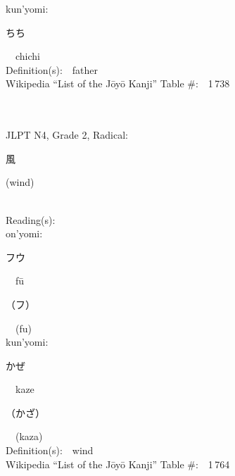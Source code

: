 \begin{multicols}{2}
{\hspace*{1em}}kun'yomi:\ \ \\
{\hspace*{2em}}{\begin{CJK}{UTF8}{min} ちち \end{CJK}}\ \ chichi\ \ \\
Definition(s):\ \ father \\
Wikipedia ``List of the J\=oy\=o Kanji'' Table \#:\ \ 1\,738 \\
\ \ \\
{\fontsize{34pt}{40pt}  }\ \ \\  %
{JLPT N4, Grade 2, Radical:\ \ {\begin{CJK}{UTF8}{min} 風 \end{CJK}} (wind) } \\
Reading(s):\ \ \\
{\hspace*{1em}}on'yomi:\ \ \\
{\hspace*{2em}}{\begin{CJK}{UTF8}{min} フウ \end{CJK}}\ \ f\=u\ \ \\
{\hspace*{2em}}{\begin{CJK}{UTF8}{min} （フ） \end{CJK}}\ \ (fu)\ \ \\
{\hspace*{1em}}kun'yomi:\ \ \\
{\hspace*{2em}}{\begin{CJK}{UTF8}{min} かぜ \end{CJK}}\ \ kaze\ \ \\
{\hspace*{2em}}{\begin{CJK}{UTF8}{min} （かざ） \end{CJK}}\ \ (kaza)\ \ \\
Definition(s):\ \ wind \\
Wikipedia ``List of the J\=oy\=o Kanji'' Table \#:\ \ 1\,764 \\
\ \ \\
{\fontsize{34pt}{40pt}  }\ \ \\  %

\end{multicols}
